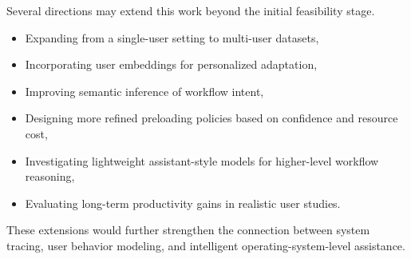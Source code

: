 \documentclass[11pt]{article}
\begin{document}
Several directions may extend this work beyond the initial feasibility stage.

\begin{itemize}
\item Expanding from a single-user setting to multi-user datasets,
\item Incorporating user embeddings for personalized adaptation,
\item Improving semantic inference of workflow intent,
\item Designing more refined preloading policies based on confidence and resource cost,
\item Investigating lightweight assistant-style models for higher-level workflow reasoning,
\item Evaluating long-term productivity gains in realistic user studies.
\end{itemize}

These extensions would further strengthen the connection between system tracing, user behavior modeling, and intelligent operating-system-level assistance.
\end{document}
